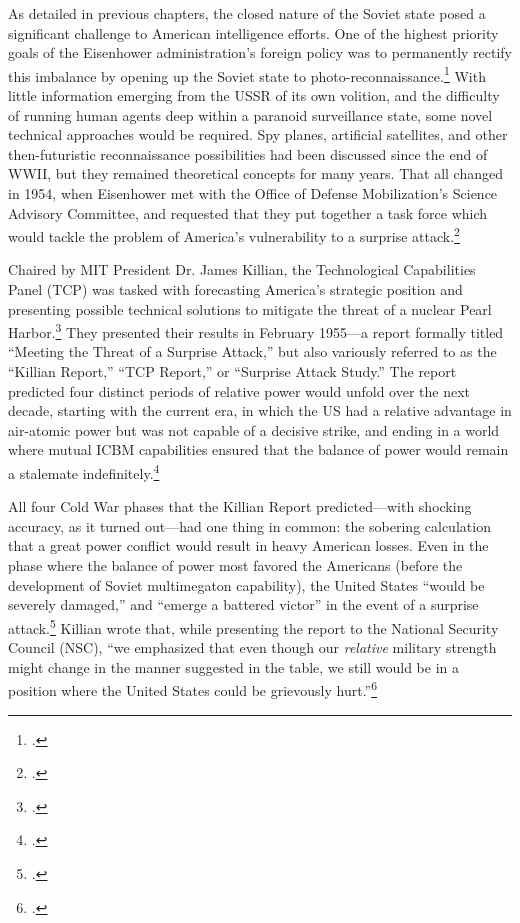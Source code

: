 \documentclass{report}
\begin{document}
As detailed in previous chapters, the closed nature of the Soviet state posed a significant challenge to American intelligence efforts. One of the highest priority goals of the Eisenhower administration's foreign policy was to permanently rectify this imbalance by opening up the Soviet state to photo-reconnaissance.\footcite[p.~65]{hayes_struggling_1994} With little information emerging from the USSR of its own volition, and the difficulty of running human agents deep within a paranoid surveillance state, some novel technical approaches would be required. Spy planes, artificial satellites, and other then-futuristic reconnaissance possibilities had been discussed since the end of WWII, but they remained theoretical concepts for many years. That all changed in 1954, when Eisenhower met with the Office of Defense Mobilization's Science Advisory Committee, and requested that they put together a task force which would tackle the problem of America's vulnerability to a surprise attack.\footcite[p.~67. The president's science advisor described this moment as the starting point for ``any complete account of how science advice was mobilized for the use of President Eisenhower.'']{killian_sputnik_1977}

Chaired by MIT President Dr. James Killian, the Technological Capabilities Panel (TCP) was tasked with forecasting America's strategic position and presenting possible technical solutions to mitigate the threat of a nuclear Pearl Harbor.\footcite[p.~115]{mcdougall_heavens_1985} They presented their results in February 1955---a report formally titled ``Meeting the Threat of a Surprise Attack,'' but also variously referred to as the ``Killian Report,'' ``TCP Report,'' or ``Surprise Attack Study.'' The report predicted four distinct periods of relative power would unfold over the next decade, starting with the current era, in which the US had a relative advantage in air-atomic power but was not capable of a decisive strike, and ending in a world where mutual ICBM capabilities ensured that the balance of power would remain a stalemate indefinitely.\footcite[p.~116]{mcdougall_heavens_1985}

All four Cold War phases that the Killian Report predicted---with shocking accuracy, as it turned out---had one thing in common: the sobering calculation that a great power conflict would result in heavy American losses. Even in the phase where the balance of power most favored the Americans (before the development of Soviet multimegaton capability), the United States ``would be severely damaged,'' and ``emerge a battered victor'' in the event of a surprise attack.\footcite{technological_capabilities_panel_meeting_1955} Killian wrote that, while presenting the report to the National Security Council (NSC), ``we emphasized that even though our \emph{relative} military strength might change in the manner suggested in the table, we still would be in a position where the United States could be grievously hurt.''\footcite[p.~75]{killian_sputnik_1977}
\end{document}
